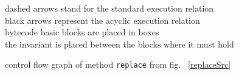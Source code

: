 \begin{figure}[!ht]
\begin{center}
\end{center}
dashed arrows stand for the standard execution relation \\ 
black arrows represent the acyclic execution relation \\
bytecode basic blocks are placed in boxes \\
the invariant is placed between the blocks where it must hold
\caption{control flow graph of method \texttt{replace} from fig. ~\ref{replaceSrc} }
\label{blockBC}
\end{figure}


